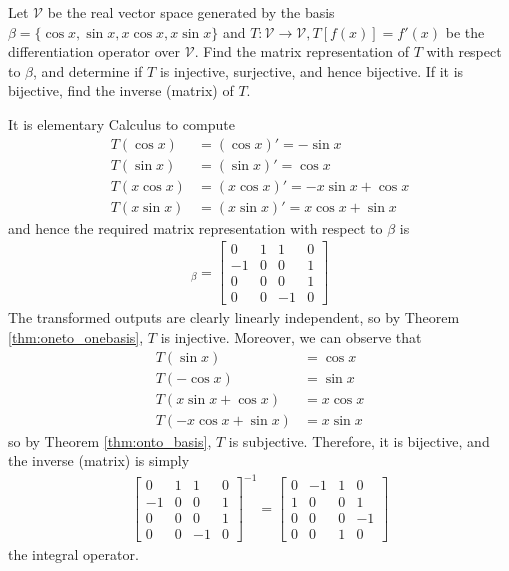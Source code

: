 \begin{Exercise}
Let $\mathcal{V}$ be the real vector space generated by the basis $\mathcal{\beta} = \{\cos x, \sin x, x\cos x, x\sin x\}$ and $T: \mathcal{V} \to \mathcal{V}, T[f(x)] = f'(x)$ be the differentiation operator over $\mathcal{V}$. Find the matrix representation of $T$ with respect to $\mathcal{\beta}$, and determine if $T$ is injective, surjective, and hence bijective. If it is bijective, find the inverse (matrix) of $T$.
\end{Exercise}
\begin{Answer}
It is elementary Calculus to compute
\begin{align*}
T(\cos x) &= (\cos x)' = -\sin x \\
T(\sin x) &= (\sin x)' = \cos x \\
T(x \cos x) &= (x \cos x)' = -x \sin x + \cos x \\
T(x \sin x) &= (x \sin x)' = x \cos x + \sin x
\end{align*}
and hence the required matrix representation with respect to $\mathcal{\beta}$ is
\begin{align*}
[T]_\beta = 
\begin{bmatrix}
0 & 1 & 1 & 0 \\
-1 & 0 & 0 & 1 \\
0 & 0 & 0 & 1 \\
0 & 0 & -1 & 0
\end{bmatrix}
\end{align*}
The transformed outputs are clearly linearly independent, so by Theorem \ref{thm:oneto_onebasis}, $T$ is injective. Moreover, we can observe that
\begin{align*}
T(\sin x) &= \cos x \\
T(-\cos x) &= \sin x \\
T(x \sin x + \cos x) &= x \cos x \\
T(-x \cos x + \sin x) &= x \sin x 
\end{align*}
so by Theorem \ref{thm:onto_basis}, $T$ is subjective. Therefore, it is bijective, and the inverse (matrix) is simply
\begin{align*}
\begin{bmatrix}
0 & 1 & 1 & 0 \\
-1 & 0 & 0 & 1 \\
0 & 0 & 0 & 1 \\
0 & 0 & -1 & 0
\end{bmatrix}^{-1}
=
\begin{bmatrix}
0&-1&1&0\\ 
1&0&0&1\\ 
0&0&0&-1\\ 
0&0&1&0
\end{bmatrix}
\end{align*}
the integral operator.
\end{Answer}

